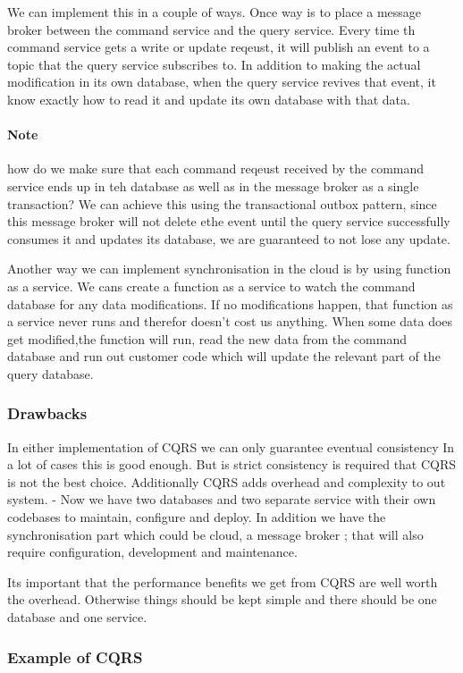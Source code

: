 We can implement this in a couple of ways.
Once way is to place a message broker between the command service and the query service.
Every time th command service gets a write or update reqeust, it will publish an event to a topic that the query service subscribes to.
In addition to making the actual modification in its own database, when the query service revives that event, it know exactly how to read it and update its own database with that data.

\paragraph{Note}
how do we make sure that each command reqeust received by the command service ends up in teh database as well as in the message broker as a single transaction?
We can achieve this using the transactional outbox pattern, since this message broker will not delete ethe event until the query service successfully consumes it and updates its database, we are guaranteed to not lose any update.

Another way we can implement synchronisation in the cloud is by using function as a service.
We cans create a function as a service to watch the command database for any data modifications.
If no modifications happen, that function as a service never runs and therefor doesn't cost us anything.
When some data does get modified,the function will run, read the new data from the command database and run out customer code which will update the relevant part of the query database.

\subsubsection{Drawbacks}
In either implementation of CQRS we can only guarantee eventual consistency
In a lot of cases this is good enough.
But is strict consistency is required that CQRS is not the best choice.
Additionally CQRS adds overhead and complexity to out system.
- Now we have two databases and two separate service with their own codebases to maintain, configure and deploy.
In addition we have the synchronisation part which could be cloud, a message broker ; that will also require configuration, development and maintenance.

Its important that the performance benefits we get from CQRS are well worth the overhead.
Otherwise things should be kept simple and there should be one database and one service.

\subsubsection{Example of CQRS}

